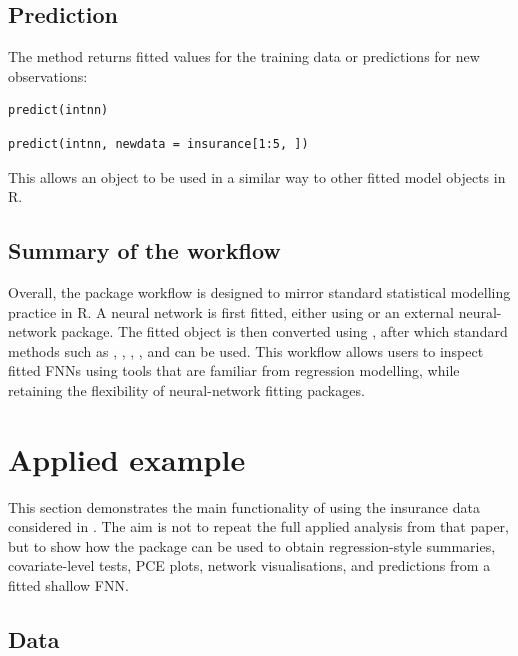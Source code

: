 \subsection{Prediction}\label{prediction}

The  method returns fitted values for the training data or predictions for new observations:

\begin{verbatim}
predict(intnn)
\end{verbatim}

\begin{verbatim}
predict(intnn, newdata = insurance[1:5, ])
\end{verbatim}

This allows an  object to be used in a similar way to other fitted model objects in R.

\subsection{Summary of the workflow}\label{summary-of-the-workflow}

Overall, the package workflow is designed to mirror standard statistical modelling practice in R.
A neural network is first fitted, either using  or an external neural-network package.
The fitted object is then converted using , after which standard methods such as , , , , and  can be used.
This workflow allows users to inspect fitted FNNs using tools that are familiar from regression modelling, while retaining the flexibility of neural-network fitting packages.

\section{Applied example}\label{sec:example}

This section demonstrates the main functionality of  using the insurance data considered in \citet{mcinerney2023feedforward}.
The aim is not to repeat the full applied analysis from that paper, but to show how the package can be used to obtain regression-style summaries, covariate-level tests, PCE plots, network visualisations, and predictions from a fitted shallow FNN.

\subsection{Data}\label{data}

